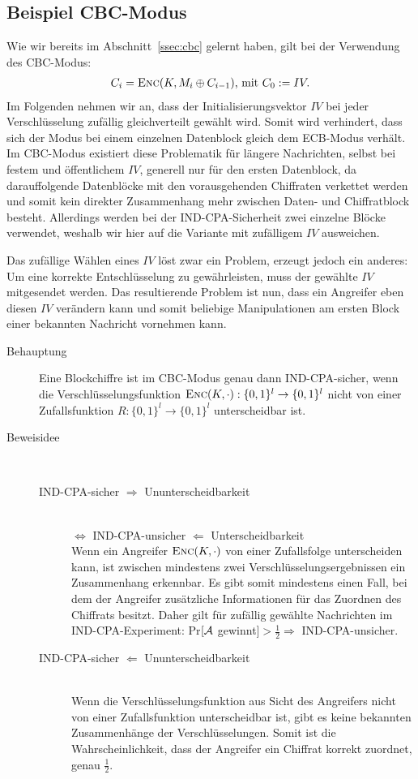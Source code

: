 \subsection{Beispiel CBC-Modus}
Wie wir bereits im Abschnitt~\ref{ssec:cbc} gelernt haben, gilt bei der Verwendung des CBC-Modus: 
\begin{align*}
C_i = \textsc{Enc}(K, M_i \oplus C_{i-1}) \text{, mit } C_0 := IV.
\end{align*}
Im Folgenden nehmen wir an, dass der Initialisierungsvektor $IV$ bei jeder Verschlüsselung zufällig gleichverteilt gewählt wird. Somit wird verhindert, dass sich der Modus bei einem einzelnen Datenblock gleich dem ECB-Modus verhält. Im CBC-Modus existiert diese Problematik für längere Nachrichten, selbst bei festem und öffentlichem $IV$, generell nur für den ersten Datenblock, da darauffolgende Datenblöcke mit den vorausgehenden Chiffraten verkettet werden und somit kein direkter Zusammenhang mehr zwischen Daten- und Chiffratblock besteht. Allerdings werden bei der IND-CPA-Sicherheit zwei einzelne Blöcke verwendet, weshalb wir hier auf die Variante mit zufälligem $IV$ ausweichen.

Das zufällige Wählen eines $IV$ löst zwar ein Problem, erzeugt jedoch ein anderes: Um eine korrekte Entschlüsselung zu gewährleisten, muss der gewählte $IV$ mitgesendet werden. Das resultierende Problem ist nun, dass ein Angreifer eben diesen $IV$ verändern kann und somit beliebige Manipulationen am ersten Block einer bekannten Nachricht vornehmen kann.

\begin{description} 
	\item[Behauptung] Eine Blockchiffre ist im CBC-Modus genau dann IND-CPA-sicher, wenn die Verschlüsselungsfunktion $\textsc{Enc}(K,\cdot): \{0,1\}^l \rightarrow
	\{0,1\}^l$ nicht von einer Zufallsfunktion $R: \{0,1\}^l \rightarrow \{0,1\}^l$ unterscheidbar ist.
	\item[Beweisidee]~
	\begin{description}
		\item[IND-CPA-sicher $\Rightarrow$ Ununterscheidbarkeit]~\\
		$\Leftrightarrow$ IND-CPA-unsicher $\Leftarrow$ Unterscheidbarkeit~\\
		Wenn ein Angreifer $\textsc{Enc}(K, \cdot)$ von einer Zufallsfolge unterscheiden kann, ist zwischen mindestens zwei Verschlüsselungsergebnissen ein Zusammenhang erkennbar. Es gibt somit mindestens einen Fall, bei dem der Angreifer zusätzliche Informationen für das Zuordnen des Chiffrats besitzt. Daher gilt für zufällig gewählte Nachrichten im IND-CPA-Experiment: Pr$[\mathcal{A}$ gewinnt$] > \frac{1}{2} \Rightarrow$ IND-CPA-unsicher.
		\item[IND-CPA-sicher $\Leftarrow$ Ununterscheidbarkeit]~\\
		Wenn die Verschlüsselungsfunktion aus Sicht des Angreifers nicht von einer Zufallsfunktion unterscheidbar ist, gibt es keine bekannten Zusammenhänge der Verschlüsselungen. Somit ist die Wahrscheinlichkeit, dass der Angreifer ein Chiffrat korrekt zuordnet, genau $\frac{1}{2}$.
	\end{description}
\end{description}

